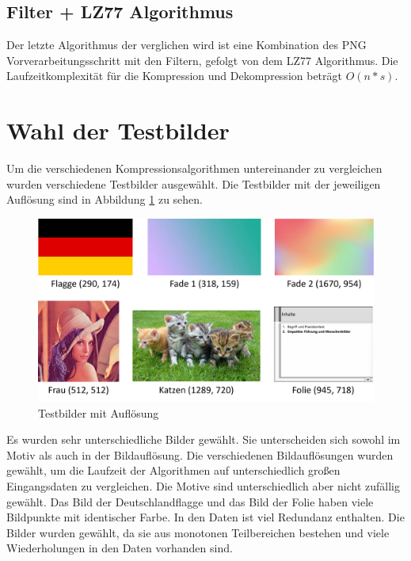 \documentclass[conference]{IEEEtran}
\begin{document}
\subsection{Filter + LZ77 Algorithmus}

Der letzte Algorithmus der verglichen wird ist eine Kombination des PNG
Vorverarbeitungsschritt mit den Filtern, gefolgt von dem LZ77 Algorithmus.
Die Laufzeitkomplexität für die Kompression und Dekompression beträgt
$O(n * s)$.

\section{Wahl der Testbilder}

Um die verschiedenen Kompressionsalgorithmen untereinander zu vergleichen wurden
verschiedene Testbilder ausgewählt.
Die Testbilder mit der jeweiligen Auflösung sind in Abbildung
\ref{fig:testbilder} zu sehen.

\begin{figure}[h]
  \centering
  \includegraphics[width=\columnwidth]{./images/Images.png}
  \caption{Testbilder mit Auflösung}
  \label{fig:testbilder}
\end{figure}

Es wurden sehr unterschiedliche Bilder gewählt.
Sie unterscheiden sich sowohl im Motiv als auch in der Bildauflösung.
Die verschiedenen Bildauflösungen wurden gewählt, um die Laufzeit der
Algorithmen auf unterschiedlich großen Eingangsdaten zu vergleichen.
Die Motive sind unterschiedlich aber nicht zufällig gewählt.
Das Bild der Deutschlandflagge und das Bild der Folie haben
viele Bildpunkte mit identischer Farbe.
In den Daten ist viel Redundanz enthalten.
Die Bilder wurden gewählt, da sie aus monotonen Teilbereichen bestehen
und viele Wiederholungen in den Daten vorhanden sind.
\end{document}
